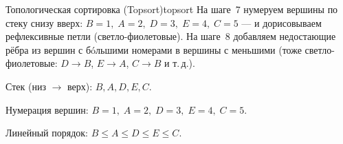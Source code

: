 \begin{algo}{Топологическая сортировка (Topsort)}{topsort}
На шаге~7 нумеруем вершины по стеку снизу вверх:
$B = 1,\; A = 2,\; D = 3,\; E = 4,\; C = 5$ --- и дорисовываем
рефлексивные петли (светло-фиолетовые). На шаге~8 добавляем недостающие
рёбра из вершин с бóльшими номерами в вершины с меньшими (тоже
светло-фиолетовые: $D \to B$, $E \to A$, $C \to B$ и т.\,д.).

\medskip
Стек (низ $\to$ верх): $B, A, D, E, C$.

Нумерация вершин: $B = 1,\; A = 2,\; D = 3,\; E = 4,\; C = 5$.

Линейный порядок: $B \leq A \leq D \leq E \leq C$.

\end{algo}
